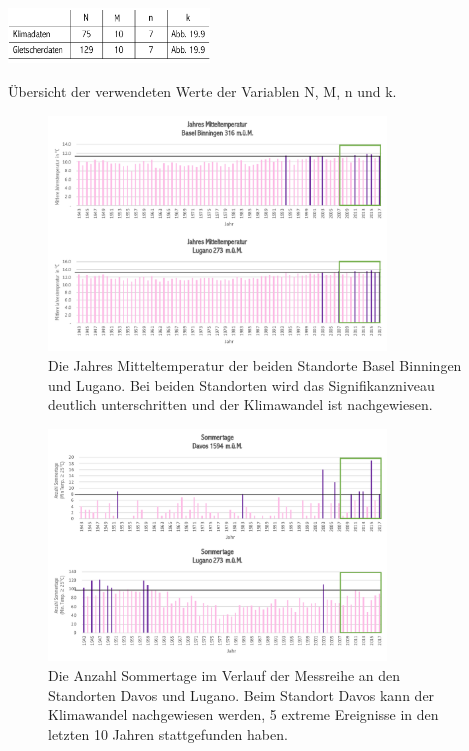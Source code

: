 \begin{refsection}
\begin{table}
\centering
\includegraphics[width=0.4\textwidth]{extrem/Tabuebersicht.pdf}
\caption{Übersicht der verwendeten Werte der Variablen N, M, n und k.}
\label{Tabuebersicht}
\end{table}


\begin{figure}
\centering
\includegraphics[width=0.8\textwidth]{extrem/JahresMittel.pdf}
\caption{Die Jahres Mitteltemperatur der beiden Standorte Basel Binningen und Lugano. Bei beiden Standorten wird das Signifikanzniveau deutlich unterschritten und der Klimawandel ist nachgewiesen.}
\label{JMittel}
\end{figure}


\begin{figure}
\centering
\includegraphics[width=0.8\textwidth]{extrem/Sommertage.pdf}
\caption{Die Anzahl Sommertage im Verlauf der Messreihe an den Standorten Davos und Lugano. Beim Standort Davos kann der Klimawandel nachgewiesen werden, 5 extreme Ereignisse in den letzten 10 Jahren stattgefunden haben.}
\label{Sommertage}
\end{figure}



\end{refsection}

